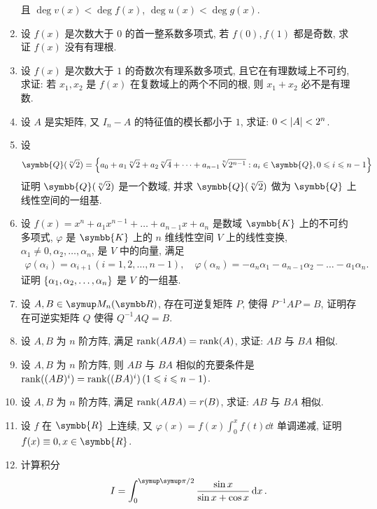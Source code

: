 \documentclass{ctexart}
\let\umathpi\pi
\renewcommand\pi{\symup\umathpi}%
\let\set\qty
\let\le\leqslant
\newcommand{\R}{\ensuremath{\symbb{R}}}
\newcommand{\K}{\ensuremath{\symbb{K}}}
\newcommand{\Q}{\ensuremath{\symbb{Q}}}
\begin{document}
\begin{enumerate}[series=exer]
    且 $ \deg v(x) < \deg f(x) $, $ \deg u(x) < \deg g(x) $.  
    \item 设 $ f(x) $ 是次数大于 $ 0 $ 的首一整系数多项式, 若 $ f(0), f(1) $ 都是奇数, 求证 $ f(x) $ 没有有理根.
    \item 设 $ f(x) $ 是次数大于 $ 1 $ 的奇数次有理系数多项式, 且它在有理数域上不可约, 求证: 若 $ x_{1}, x_{2} $ 是 $ f(x) $ 在复数域上的两个不同的根, 则 $ x_{1} + x_{2} $ 必不是有理数.
    \item 设 $ A $ 是实矩阵, 又 $ I_{n} - A $ 的特征值的模长都小于 $ 1 $, 求证: $ 0<\abs{A}<2^{n} $. 
    \item 设
    \begin{align*}
        \Q(\sqrt[n]{2}) = \set{a_{0} + a_{1}\sqrt[n]{2} + a_{2}\sqrt[n]{4} + \dots + a_{n-1}\sqrt[n]{2^{n-1}} : a_{i} \in \Q, 0\le i\le n-1}
    \end{align*}
    证明 $ \Q(\sqrt[n]{2}) $ 是一个数域, 并求 $ \Q(\sqrt[n]{2}) $ 做为 $ \Q $ 上线性空间的一组基.
    \item 设 $ f(x) = x^{n} + a_{1}x^{n-1} + \dots + a_{n-1}x + a_{n} $ 是数域 $ \K $ 上的不可约多项式, $ \varphi $ 是 $ \K $ 上的 $ n $ 维线性空间 $ V $ 上的线性变换, $ \alpha_{1} \ne 0, \alpha_{2}, \dots, \alpha_{n} $, 是 $ V $ 中的向量, 满足 
    \begin{align*}
        \varphi(\alpha_{i}) = \alpha_{i + 1}\,(i = 1, 2, \dots, n-1), \quad \varphi(\alpha_{n}) = -a_{n}\alpha_{1} - a_{n-1}\alpha_{2} - \dots - a_{1}\alpha_{n}.
    \end{align*}
    证明 $ \set{\alpha_{1}, \alpha_{2}, \dots, \alpha_{n}} $ 是 $ V $ 的一组基. 
    \item 设 $ A, B \in \MM $, 存在可逆复矩阵 $ P $, 使得 $ P^{-1}AP = B $, 证明存在可逆实矩阵 $ Q $ 使得 $ Q^{-1}AQ = B $.   
    \item 设 $ A, B $ 为 $ n $ 阶方阵, 满足 $ \rank(ABA) = \rank(A) $, 求证: $ AB $ 与 $ BA $ 相似.
    \item 设 $ A, B $ 为 $ n $ 阶方阵, 则 $ AB $ 与 $ BA $ 相似的充要条件是 $ \rank((AB)^{i}) = \rank((BA)^{i})\,(1 \le i \le n - 1) $.
    \item  设 $ A, B $ 为 $ n $ 阶方阵, 满足 $ \rank(ABA) = r(B) $, 求证: $ AB $ 与 $ BA $ 相似.
    \item 设 $ f $ 在 $ \R $ 上连续, 又 $ \varphi(x) = f(x)\int_{0}^{x} f(t) \dd{t} $ 单调递减, 证明 $ f(x) \equiv 0, x\in\R $.
    \item 计算积分
    \begin{align*}
        I = \int_{0}^{\pi/2} \frac{\sin x}{\sin x + \cos x} \dd{x}.

\end{align*}
\end{enumerate}
\end{document}
